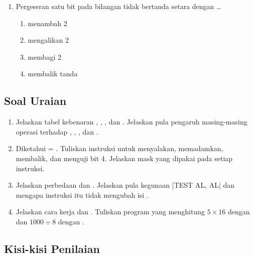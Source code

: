 \begin{enumerate}
    \item Pergeseran  satu bit pada bilangan tidak bertanda
          setara dengan \dots
          \begin{enumerate}
              \item menambah 2
              \item mengalikan 2
              \item membagi 2
              \item membalik tanda
          \end{enumerate}
\end{enumerate}

\subsection{Soal Uraian}

\begin{enumerate}
    \item Jelaskan tabel kebenaran , , ,
          dan . Jelaskan pula pengaruh masing-masing
          operasi terhadap , , , dan
          .

    \item Diketahui  = . Tuliskan instruksi untuk
          menyalakan, memadamkan, membalik, dan menguji bit 4.
          Jelaskan mask yang dipakai pada setiap instruksi.

    \item Jelaskan perbedaan  dan . Jelaskan
          pula kegunaan \lstasm|TEST AL, AL| dan mengapa instruksi
          itu tidak mengubah isi .

    \item Jelaskan cara kerja  dan . Tuliskan
          program yang menghitung $5 \times 16$ dengan 
          dan $1000 \div 8$ dengan .
\end{enumerate}

\subsection{Kisi-kisi Penilaian}

